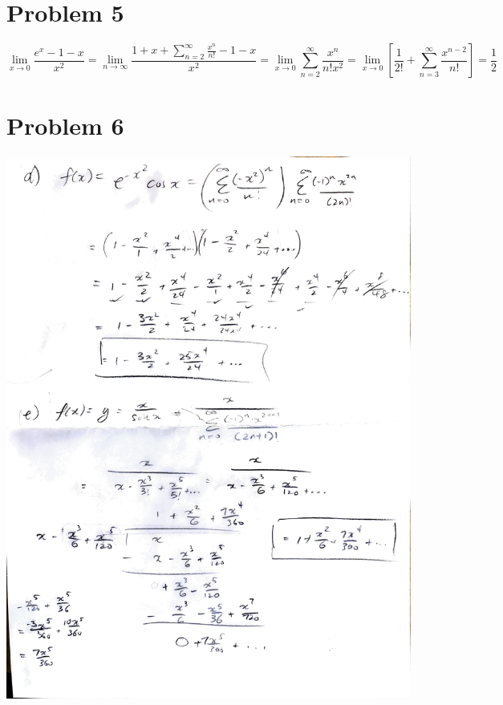 \documentclass[preview, margin=0.6in]{standalone}
\newcommand*{\problem}[1]{\section*{Problem #1}}
\begin{document}
\problem{5}
\begin{equation*}
    \lim_{x\to0}\frac{e^x-1-x}{x^2}
	=\lim_{n\to\infty}\frac{1+x+\sum_{n=2}^{\infty}\frac{x^n}{n!}-1-x}{x^2}
	=\lim_{x\to0}\sum_{n=2}^{\infty}\frac{x^n}{n!x^2}
	=\lim_{x\to0}\left[\frac{1}{2!}+\sum_{n=3}^{\infty}\frac{x^{n-2}}{n!}\right]
	=\boxed{\frac12}
\end{equation*}

\problem{6}
\begin{center}
	\includegraphics[scale=0.75, page=1]{q6.pdf}

\end{center}
\end{document}
